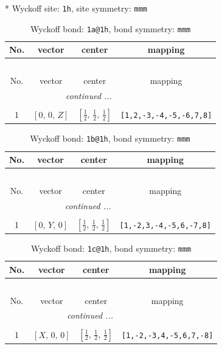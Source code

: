 \documentclass[fleqn,8pt]{jsarticle}
\begin{document}
* Wyckoff site: {\tt 1h}, site symmetry: {\tt mmm}
\renewcommand{\arraystretch}{1.2}
\begin{longtable}{cccc}
\caption{Wyckoff bond: {\tt 1a@1h}, bond symmetry: {\tt mmm}}
 \\
 \hline \hline
No. & vector & center & mapping \\ \hline \endfirsthead

\multicolumn{3}{l}{\tablename\ \thetable{}} \\
 \hline \hline
No. & vector & center & mapping \\ \hline \endhead

 \hline \hline
\multicolumn{3}{r}{\footnotesize\it continued ...} \\ \endfoot

 \hline \hline
\multicolumn{3}{r}{} \\ \endlastfoot

1 & $\left[ 0,\, 0,\, Z \right]$ & $\left[ \frac{1}{2},\, \frac{1}{2},\, \frac{1}{2} \right]$ & {\tt [1,2,-3,-4,-5,-6,7,8]} \\
\end{longtable}
\renewcommand{\arraystretch}{1.2}
\begin{longtable}{cccc}
\caption{Wyckoff bond: {\tt 1b@1h}, bond symmetry: {\tt mmm}}
 \\
 \hline \hline
No. & vector & center & mapping \\ \hline \endfirsthead

\multicolumn{3}{l}{\tablename\ \thetable{}} \\
 \hline \hline
No. & vector & center & mapping \\ \hline \endhead

 \hline \hline
\multicolumn{3}{r}{\footnotesize\it continued ...} \\ \endfoot

 \hline \hline
\multicolumn{3}{r}{} \\ \endlastfoot

1 & $\left[ 0,\, Y,\, 0 \right]$ & $\left[ \frac{1}{2},\, \frac{1}{2},\, \frac{1}{2} \right]$ & {\tt [1,-2,3,-4,-5,6,-7,8]} \\
\end{longtable}
\renewcommand{\arraystretch}{1.2}
\begin{longtable}{cccc}
\caption{Wyckoff bond: {\tt 1c@1h}, bond symmetry: {\tt mmm}}
 \\
 \hline \hline
No. & vector & center & mapping \\ \hline \endfirsthead

\multicolumn{3}{l}{\tablename\ \thetable{}} \\
 \hline \hline
No. & vector & center & mapping \\ \hline \endhead

 \hline \hline
\multicolumn{3}{r}{\footnotesize\it continued ...} \\ \endfoot

 \hline \hline
\multicolumn{3}{r}{} \\ \endlastfoot

1 & $\left[ X,\, 0,\, 0 \right]$ & $\left[ \frac{1}{2},\, \frac{1}{2},\, \frac{1}{2} \right]$ & {\tt [1,-2,-3,4,-5,6,7,-8]} \\
\end{longtable}
\end{document}

